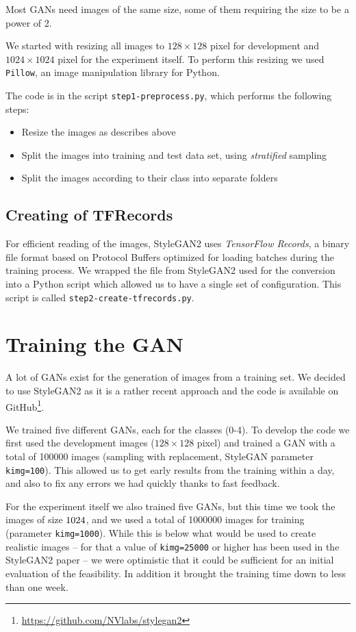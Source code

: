 \documentclass[sigconf,nonacm]{acmart}
\begin{document}
Most GANs need images of the same size, some of them requiring
the size to be a power of 2.

We started with resizing all images to $128\times128$
pixel for development
and $1024\times1024$ pixel for the experiment itself.
To perform this resizing we used \texttt{Pillow}, an image
manipulation library for Python.

The code is in the script \texttt{step1-preprocess.py},
which performs the following steps:
\begin{itemize}
\item Resize the images as describes above
\item Split the images into training and test data set, using
\emph{stratified} sampling
\item Split the images according to their class into separate folders
\end{itemize}

\subsection{Creating of TFRecords}

For efficient reading of the images, StyleGAN2 uses \emph{TensorFlow Records},
a binary file format based on Protocol Buffers optimized for loading batches
during the training process.
We wrapped the file from StyleGAN2 used for the conversion into
a Python script which allowed us to have a single set of configuration.
This script is called \texttt{step2-create-tfrecords.py}.

\section{Training the GAN}

A lot of GANs exist for the generation of images from a training set.
We decided to use
StyleGAN2\cite{stylegan2}
as it is a rather recent approach and the code is available on
GitHub\footnote{\url{https://github.com/NVlabs/stylegan2}}.

We trained five different GANs, each for the classes (0-4).
To develop the code we first used the development images ($128\times128$ pixel)
and trained a GAN with a total of \SI{100000}{} images
(sampling with replacement, StyleGAN parameter \texttt{kimg=100}).
This allowed us to get early results from the training within a day,
and also to fix any errors we had quickly thanks to fast feedback.

For the experiment itself we also trained five GANs, but this time
we took the images of size $1024\time1024$, and we used a total
of \SI{1000000}{} images for training (parameter \texttt{kimg=1000}).
While this is below what would be used to create realistic images --
for that a value of \texttt{kimg=25000} or higher has been used in the
StyleGAN2 paper -- we were optimistic that it could be sufficient for
an initial evaluation of the feasibility.
In addition it brought the training
time down to less than one week.
\end{document}

